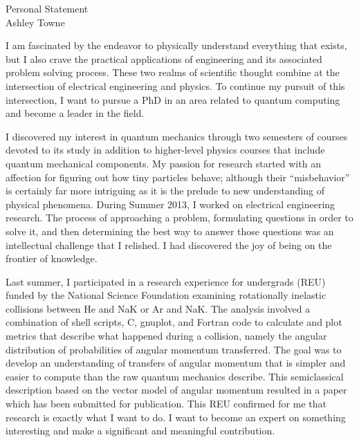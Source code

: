 \setlength{\oddsidemargin}{0in}
\setlength{\evensidemargin}{0in}
\setlength{\textwidth}{6.5in}
\setlength{\topmargin}{-.3in}
\setlength{\textheight}{9in}
\pagestyle{empty}



\begin{center}
{\Large Personal Statement} \\[.3in]
{\large Ashley Towne}
\end{center}

\vspace*{.5in}

{I am fascinated by the endeavor to physically understand everything that
    exists, but I also crave the practical applications of engineering and its
    associated problem solving process. These two realms of scientific thought
    combine at the intersection of electrical engineering and physics. To
    continue my pursuit of this intersection, I want to pursue a PhD in an area
    related to quantum computing and become a leader in the field. 

    I discovered my interest in quantum mechanics through two semesters of
    courses devoted to its study in addition to higher-level physics courses
    that include quantum mechanical components. My passion for research started
    with an affection for figuring out how tiny particles behave; although
    their “misbehavior” is certainly far more intriguing as it is the prelude
    to new understanding of physical phenomena. During Summer 2013, I worked on
    electrical engineering research. The process of approaching a problem,
    formulating questions in order to solve it, and then determining the best
    way to answer those questions was an intellectual challenge that I
    relished. I had discovered the joy of being on the frontier of knowledge.

    Last summer, I participated in a research experience for undergrads (REU)
    funded by the National Science Foundation examining rotationally inelastic
    collisions between He and NaK or Ar and NaK. The analysis involved a
    combination of shell scripts, C, gnuplot, and Fortran code to calculate and
    plot metrics that describe what happened during a collision, namely the
    angular distribution of probabilities of angular momentum transferred.  The
    goal was to develop an understanding of transfers of angular momentum that
    is simpler and easier to compute than the raw quantum mechanics describe.
    This semiclassical description based on the vector model of angular
    momentum resulted in a paper which has been submitted for publication.
    This REU confirmed for me that research is exactly what I want to do.  I
    want to become an expert on something interesting and make a significant
    and meaningful contribution.

}
